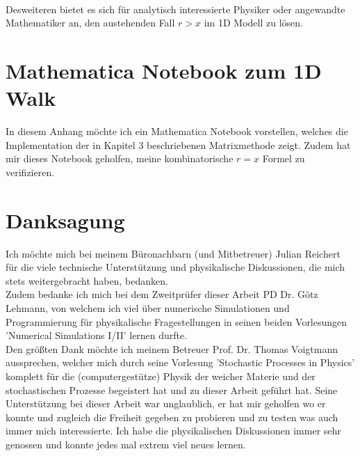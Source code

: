 \documentclass[a4paper, 12pt]{report}
\begin{document}
\\
Desweiteren bietet es sich für analytisch interessierte Physiker oder angewandte Mathematiker an, den austehenden Fall $r>x$ im 1D Modell zu lösen.

\appendix
\chapter{Mathematica Notebook zum 1D Walk}
In diesem Anhang möchte ich ein Mathematica Notebook vorstellen, welches die Implementation der in Kapitel 3 beschriebenen Matrixmethode zeigt. Zudem hat mir dieses Notebook geholfen, meine kombinatorische $r=x$ Formel zu verifizieren.
	


\chapter*{Danksagung}
Ich möchte mich bei meinem Büronachbarn (und Mitbetreuer) Julian Reichert für die viele technische Unterstützung und physikalische Diskussionen, die mich stets weitergebracht haben, bedanken. 
\\
Zudem bedanke ich mich bei dem Zweitprüfer dieser Arbeit PD Dr. Götz Lehmann, von welchem ich viel über numerische Simulationen und Programmierung für physikalische Fragestellungen in seinen beiden Vorlesungen 'Numerical Simulations I/II' lernen durfte.
\\
Den größten Dank möchte ich meinem Betreuer Prof. Dr. Thomas Voigtmann aussprechen, welcher mich durch seine Vorlesung 'Stochastic Processes in Physics' komplett für die (computergestütze) Physik der weicher Materie und der stochastischen Prozesse begeistert hat und zu dieser Arbeit geführt hat. Seine Unterstützung bei dieser Arbeit war unglaublich, er hat mir geholfen wo er konnte und zugleich die Freiheit gegeben zu probieren und zu testen was auch immer mich interessierte. Ich habe die physikalischen Diskussionen immer sehr genossen und konnte jedes mal extrem viel neues lernen.




\end{document}
